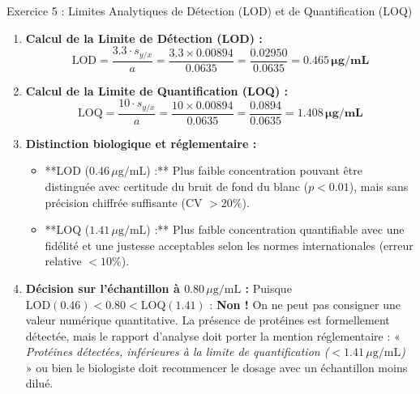 \documentclass[11pt,a4paper]{article}
\begin{document}
\begin{solutionbox}{Exercice 5 : Limites Analytiques de Détection (LOD) et de Quantification (LOQ)}
\begin{enumerate}[label=\textbf{\alph*.}]
  \item \textbf{Calcul de la Limite de Détection (LOD) :}
  \begin{equation*}
    \text{LOD} = \frac{3.3 \cdot s_{y/x}}{a} = \frac{3.3 \times 0.00894}{0.0635} = \frac{0.02950}{0.0635} = \mathbf{0.465\,\mu\text{g/mL}}
  \end{equation*}

  \item \textbf{Calcul de la Limite de Quantification (LOQ) :}
  \begin{equation*}
    \text{LOQ} = \frac{10 \cdot s_{y/x}}{a} = \frac{10 \times 0.00894}{0.0635} = \frac{0.0894}{0.0635} = \mathbf{1.408\,\mu\text{g/mL}}
  \end{equation*}

  \item \textbf{Distinction biologique et réglementaire :}
  \begin{itemize}
    \item **LOD ($0.46\,\mu\text{g/mL}$) :** Plus faible concentration pouvant être distinguée avec certitude du bruit de fond du blanc ($p < 0.01$), mais sans précision chiffrée suffisante (CV $> 20\%$).
    \item **LOQ ($1.41\,\mu\text{g/mL}$) :** Plus faible concentration quantifiable avec une fidélité et une justesse acceptables selon les normes internationales (erreur relative $< 10\%$).
  \end{itemize}

  \item \textbf{Décision sur l'échantillon à $0.80\,\mu\text{g/mL}$ :}
  Puisque $\text{LOD} (0.46) < 0.80 < \text{LOQ} (1.41)$ :
  \textbf{Non !} On ne peut pas consigner une valeur numérique quantitative. La présence de protéines est formellement détectée, mais le rapport d'analyse doit porter la mention réglementaire : « \textit{Protéines détectées, inférieures à la limite de quantification ($< 1.41\,\mu\text{g/mL}$)} » ou bien le biologiste doit recommencer le dosage avec un échantillon moins dilué.
\end{enumerate}
\end{solutionbox}
\end{document}
